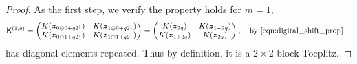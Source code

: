 \documentclass{svjour3}                     %
\newcommand{\bm}[1]{\boldsymbol{#1}}
\newcommand{\vz}{\bm{z}}
\newcommand{\mK}{\mathsf{K}}
\begin{document}
\begin{proof}
	\iftrue
	As the first step, we verify the property holds for $m=1$,
	\begin{align*}
	\mK^{(1, q)} &= \begin{pmatrix}
	K(\vz_{0 \ominus 0 + q 2^1}) & K(\vz_{1 \ominus 0 + q 2^1})  \\
	K(\vz_{0 \ominus 1 + q 2^1}) & K(\vz_{1 \ominus 1 + q 2^1})  
	\end{pmatrix} = 
	\begin{pmatrix}
	K(\vz_{2q}) & K(\vz_{1 + 2q}) \\ K(\vz_{1 + 2q}) & K(\vz_{2q})
	\end{pmatrix}, \quad \text{by \eqref{eqn:digital_shift_prop}}
	\end{align*} has diagonal elements repeated. Thus by definition, it is a $2\times 2$ block-Toeplitz.
	\fi 
	

\end{proof}
\end{document}
